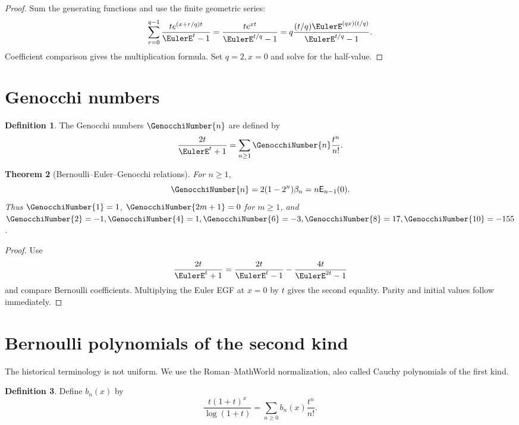 \documentclass[11pt,a4paper,oneside,openany]{book}
\newtheorem{theorem}{Theorem}[chapter]
\theoremstyle{definition}
\newtheorem{definition}[theorem]{Definition}
\theoremstyle{remark}
\begin{document}
\begin{proof}
Sum the generating functions and use the finite geometric series:
\[
 \sum_{r=0}^{q-1}\frac{te^{(x+r/q)t}}{\EulerE^t-1}
 =\frac{te^{xt}}{\EulerE^{t/q}-1}
 =q\frac{(t/q)\EulerE^{(qx)(t/q)}}{\EulerE^{t/q}-1}.
\]
Coefficient comparison gives the multiplication formula.  Set $q=2,x=0$ and
solve for the half-value.
\end{proof}

\section{Genocchi numbers}

\begin{definition}
The Genocchi numbers $\GenocchiNumber{n}$ are defined by
\begin{equation}
 \frac{2t}{\EulerE^t+1}=\sum_{n\geq1}\GenocchiNumber{n}\frac{t^n}{n!}.                  \label{eq:merged-genocchi-egf}
\end{equation}
\end{definition}

\begin{theorem}[Bernoulli--Euler--Genocchi relations]
\label{thm:merged-genocchi}
For $n\geq1$,
\begin{equation}
 \GenocchiNumber{n}=2(1-2^n)\beta_n=n\mathsf E_{n-1}(0).                           \label{eq:merged-genocchi}
\end{equation}
Thus $\GenocchiNumber{1}=1$, $\GenocchiNumber{2m+1}=0$ for $m\geq1$, and
$\GenocchiNumber{2}=-1,\GenocchiNumber{4}=1,\GenocchiNumber{6}=-3,\GenocchiNumber{8}=17,\GenocchiNumber{10}=-155$.
\end{theorem}

\begin{proof}
Use
\[
 \frac{2t}{\EulerE^t+1}=\frac{2t}{\EulerE^t-1}-\frac{4t}{\EulerE^{2t}-1}
\]
and compare Bernoulli coefficients.  Multiplying the Euler EGF at $x=0$ by
$t$ gives the second equality.  Parity and initial values follow immediately.
\end{proof}

\section{Bernoulli polynomials of the second kind}

The historical terminology is not uniform.  We use the Roman--MathWorld
normalization, also called Cauchy polynomials of the first kind.

\begin{definition}
Define $b_n(x)$ by
\begin{equation}
 \frac{t(1+t)^x}{\log(1+t)}
 =\sum_{n\geq0}b_n(x)\frac{t^n}{n!}.                               \label{eq:merged-bernoulli-second-egf}
\end{equation}
\end{definition}
\end{document}
